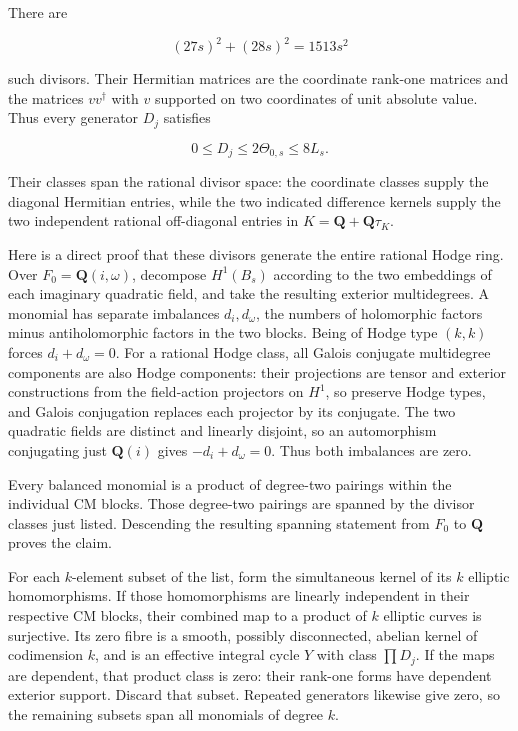 There are

\[
 (27s)^2+(28s)^2=1513s^2
 \tag{F12.15}
\]

such divisors. Their Hermitian matrices are the coordinate rank-one
matrices and the matrices \(vv^\dagger\) with \(v\) supported on two
coordinates of unit absolute value. Thus every generator \(D_j\)
satisfies

\[
 0\le D_j\le2\Theta_{0,s}\le8L_s.
 \tag{F12.16}
\]

Their classes span the rational divisor space: the coordinate classes
supply the diagonal Hermitian entries, while the two indicated
difference kernels supply the two independent rational off-diagonal
entries in \(K=\mathbf Q+\mathbf Q\tau_K\).

Here is a direct proof that these divisors generate the entire rational
Hodge ring. Over \(F_0=\mathbf Q(i,\omega)\), decompose \(H^1(B_s)\)
according to the two embeddings of each imaginary quadratic field, and
take the resulting exterior multidegrees. A monomial has separate
imbalances \(d_i,d_\omega\), the numbers of holomorphic factors minus
antiholomorphic factors in the two blocks. Being of Hodge type \((k,k)\)
forces \(d_i+d_\omega=0\). For a rational Hodge class, all Galois
conjugate multidegree components are also Hodge components: their
projections are tensor and exterior constructions from the field-action
projectors on \(H^1\), so preserve Hodge types, and Galois conjugation
replaces each projector by its conjugate. The two quadratic fields are
distinct and linearly disjoint, so an automorphism conjugating just
\(\mathbf Q(i)\) gives \(-d_i+d_\omega=0\). Thus both imbalances are
zero.

Every balanced monomial is a product of degree-two pairings within the
individual CM blocks. Those degree-two pairings are spanned by the
divisor classes just listed. Descending the resulting spanning statement
from \(F_0\) to \(\mathbf Q\) proves the claim.

For each \(k\)-element subset of the list, form the simultaneous kernel
of its \(k\) elliptic homomorphisms. If those homomorphisms are linearly
independent in their respective CM blocks, their combined map to a
product of \(k\) elliptic curves is surjective. Its zero fibre is a
smooth, possibly disconnected, abelian kernel of codimension \(k\), and
is an effective integral cycle \(Y\) with class \(\prod D_j\). If the
maps are dependent, that product class is zero: their rank-one forms
have dependent exterior support. Discard that subset. Repeated
generators likewise give zero, so the remaining subsets span all
monomials of degree \(k\).

